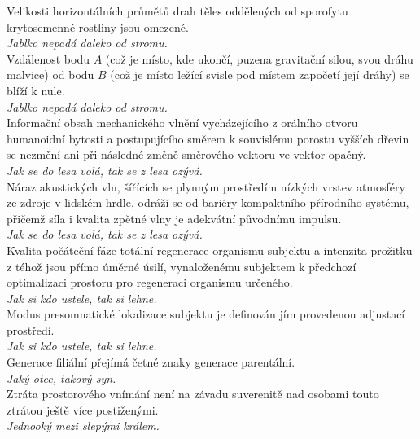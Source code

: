 \begin{multicols}{2}
\noindent
Velikosti horizontálních průmětů drah těles oddělených od
sporofytu krytosemenné rostliny jsou omezené.\\[1 mm]
{\sl Jablko nepadá daleko od stromu.}\\

\noindent
Vzdálenost bodu $A$ (což je místo, kde ukončí, puzena gravitační
silou, svou dráhu malvice) od bodu $B$ (což je místo ležící svisle
pod místem započetí její dráhy) se blíží k nule.\\[1 mm]
{\sl Jablko nepadá daleko od stromu.}\\

\noindent
Informační obsah mechanického vlnění vycházejícího z orálního
otvoru humanoidní bytosti a postupujícího směrem k souvislému
porostu vyšších dřevin se nezmění ani při následné změně směrového
vektoru ve vektor opačný.\\[1 mm]
{\sl Jak se do lesa volá, tak se z lesa ozývá.}\\

\noindent
Náraz akustických vln, šířících se plynným prostředím nízkých
vrstev atmosféry ze zdroje v lidském hrdle, odráží se od bariéry
kompaktního přírodního systému, přičemž síla i kvalita zpětné vlny
je adekvátní původnímu impulsu.\\[1 mm]
{\sl Jak se do lesa volá, tak se z lesa ozývá.}\\

\noindent
Kvalita počáteční fáze totální regenerace organismu subjektu
a intenzita prožitku z téhož jsou přímo úměrné úsilí, vynaloženému
subjektem k předchozí optimalizaci prostoru pro regeneraci organismu
určeného.\\[1 mm]
{\sl Jak si kdo ustele, tak si lehne.}\\

\noindent
Modus presomnatické lokalizace subjektu je definován jím
provedenou adjustací prostředí.\\[1 mm]
{\sl Jak si kdo ustele, tak si lehne.}\\

\noindent
Generace filiální přejímá četné znaky generace parentální.\\[1 mm]
{\sl Jaký otec, takový syn.}\\

\noindent
Ztráta prostorového vnímání není na závadu suverenitě nad
osobami touto ztrátou ještě více postiženými.\\[1 mm]
{\sl Jednooký mezi slepými králem.}\\


\end{multicols}
